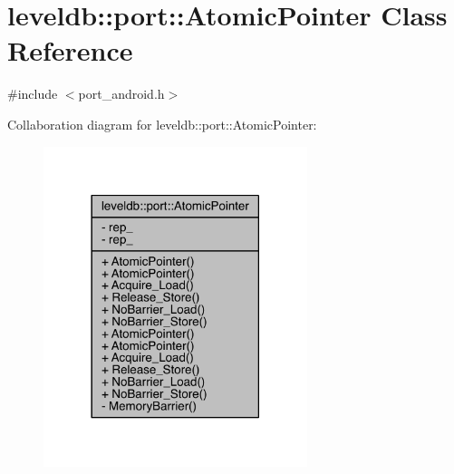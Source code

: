 \hypertarget{classleveldb_1_1port_1_1_atomic_pointer}{}\section{leveldb\+:\+:port\+:\+:Atomic\+Pointer Class Reference}
\label{classleveldb_1_1port_1_1_atomic_pointer}


{\ttfamily \#include $<$port\+\_\+android.\+h$>$}



Collaboration diagram for leveldb\+:\+:port\+:\+:Atomic\+Pointer\+:\nopagebreak
\begin{figure}[H]
\begin{center}
\leavevmode
\includegraphics[width=218pt]{classleveldb_1_1port_1_1_atomic_pointer__coll__graph}
\end{center}
\end{figure}
